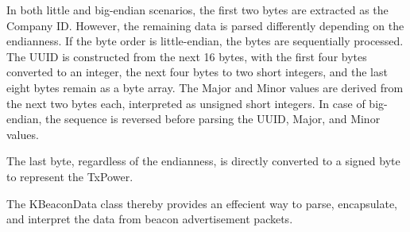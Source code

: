 In both little and big-endian scenarios, the first two bytes are extracted as the Company ID.
However, the remaining data is parsed differently depending on the endianness. If the byte order is little-endian, the bytes are sequentially processed. The UUID is constructed from the next 16 bytes, with the first four bytes converted to an integer, the next four bytes to two short integers, and the last eight bytes remain as a byte array. The Major and Minor values are derived from the next two bytes each, interpreted as unsigned short integers. In case of big-endian, the sequence is reversed before parsing the UUID, Major, and Minor values.

The last byte, regardless of the endianness, is directly converted to a signed byte to represent the TxPower.


The KBeaconData class thereby provides an effecient way to parse, encapsulate, and interpret the data from beacon advertisement packets.

